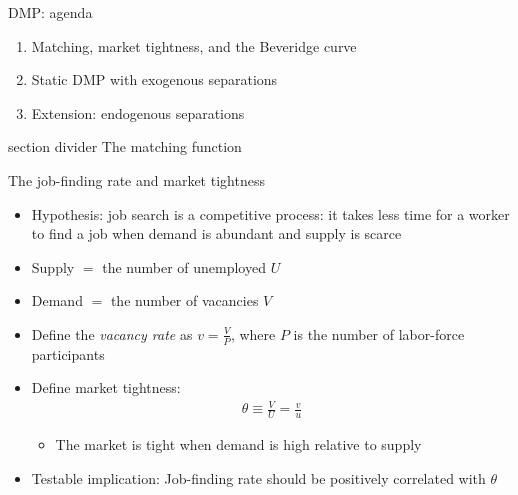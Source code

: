 \documentclass[9pt]{beamer}
\newcommand{\sectiondivider}[1]{
	\begin{frame}[plain]
		\vfill
		\begin{beamercolorbox}[wd=.84\textwidth,sep=1.1em,center,rounded=true]{section divider}
			{\usebeamerfont{section title} #1}
		\end{beamercolorbox}
		\vfill
	\end{frame}
}
\newcommand{\bit}{\begin{itemize}}
\newcommand{\eit}{\end{itemize}}
\newcommand{\ben}{\begin{enumerate}}
\newcommand{\een}{\end{enumerate}}
\newcommand{\bc}{\color{blue}}
\begin{document}
\begin{frame}{DMP: agenda}

\ben
\setlength\itemsep{1em}

\item Matching, market tightness, and the Beveridge curve

\item Static DMP with exogenous separations

\item Extension: endogenous separations



\een

\end{frame}


\sectiondivider{The matching function}



\begin{frame}{The job-finding rate and market tightness}

\bit
\setlength\itemsep{2em}

\item Hypothesis: job search is a competitive process: it takes less time for a worker to find a job when demand is abundant and supply is scarce

\item Supply $=$ the number of unemployed $U$

\item Demand $=$ the number of vacancies $V$

\item Define the \emph{vacancy rate} as $v = \frac{V}{P}$, where $P$ is the number of labor-force participants

\item Define market tightness:
\begin{eqnarray}
\theta \equiv \frac{V}{U} = \frac{v}{u} \nonumber
\end{eqnarray}
\bit
	\item The market is tight when demand is high relative to supply
\eit

\item {\bc Testable implication}: Job-finding rate should be positively correlated with $\theta$

\eit
\end{frame}
\end{document}
